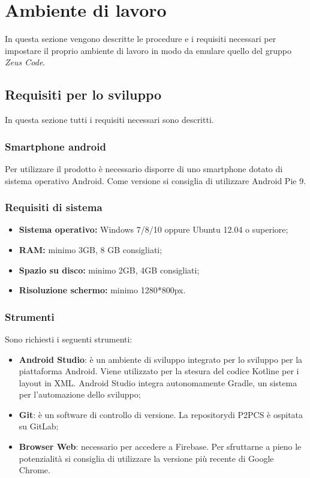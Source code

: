 \section{Ambiente di lavoro}
In questa sezione vengono descritte le procedure e i requisiti necessari per impostare il proprio ambiente di lavoro in modo da emulare quello del gruppo \textit{Zeus Code}.  
\subsection{Requisiti per lo sviluppo}
In questa sezione tutti i requisiti necessari sono descritti.
\subsubsection{Smartphone android}
Per utilizzare il prodotto è necessario disporre di uno smartphone dotato di sistema operativo Android\glo. Come versione si consiglia di utilizzare Android Pie 9.
\subsubsection{Requisiti di sistema}
\begin{itemize}
	\item \textbf{Sistema operativo:} Windows 7/8/10 oppure Ubuntu 12.04 o superiore;
	\item \textbf{RAM:} minimo 3GB, 8 GB consigliati;
	\item \textbf{Spazio su disco:} minimo 2GB, 4GB consigliati;
	\item \textbf{Risoluzione schermo:} minimo 1280*800px.
\end{itemize}
\subsubsection{Strumenti}
Sono richiesti i seguenti strumenti:
\begin{itemize}
	\item \textbf{Android Studio}: è un ambiente di sviluppo integrato per lo sviluppo per la piattaforma Android\glo. Viene utilizzato per la stesura del codice Kotlin\glosp e per i layout in XML\glo. Android Studio integra autonomamente Gradle, un sistema per l'automazione dello sviluppo;
	\item \textbf{Git}: è un software di controllo di versione. La repository\glosp di P2PCS è ospitata su GitLab\glo;
	\item \textbf{Browser Web}: necessario per accedere a Firebase\glo. Per sfruttarne a pieno le potenzialità si consiglia di utilizzare la versione più recente di Google Chrome.
\end{itemize}
